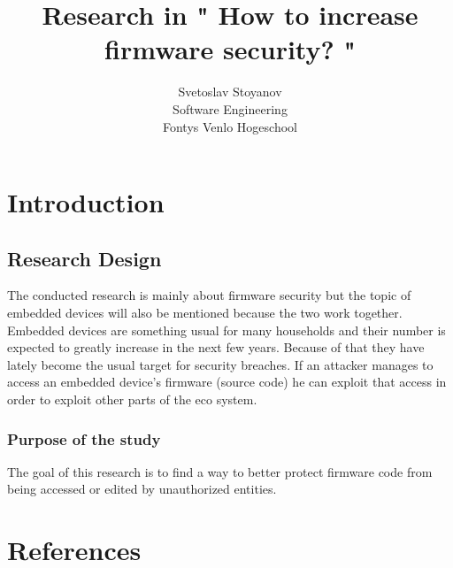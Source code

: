 \documentclass[]{report}
\begin{document}
\title{Research in " How to increase firmware security? " }
\author{Svetoslav Stoyanov \\
	Software Engineering \\
	Fontys Venlo Hogeschool}

\maketitle

\tableofcontents
\chapter{Introduction}
\section{Research Design}
The conducted research is mainly about firmware security but the topic of embedded devices will also be mentioned because the two work together.
Embedded devices are something usual for many households and their number is expected to greatly increase in the next few years. Because of that they have lately become the usual target for security breaches. If an attacker manages to access an embedded device's firmware (source code) he can exploit that access in order to exploit other parts of the eco system.

\subsection{Purpose of the study} 
The goal of this research is to find a way to better protect firmware code from being accessed or edited by unauthorized entities.
\chapter{References}
\end{document}
